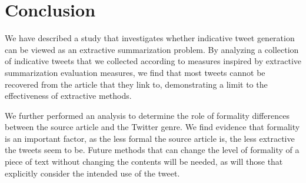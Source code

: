 \section{Conclusion}
We have described a study that investigates whether indicative tweet generation can be viewed as an extractive summarization problem. By analyzing a collection of indicative tweets that we collected according to measures inspired by extractive summarization evaluation measures, we 
find that most tweets cannot be recovered from the article that they link to, demonstrating a limit to the effectiveness of extractive methods.

We further performed an analysis to determine the role of formality differences between the source article and the Twitter genre. We find evidence that formality is an important factor, as the less formal the source article is, the less extractive the tweets seem to be. Future methods that can change the level of formality of a piece of text without changing the contents will be needed, as will those that explicitly consider the intended use of the tweet.